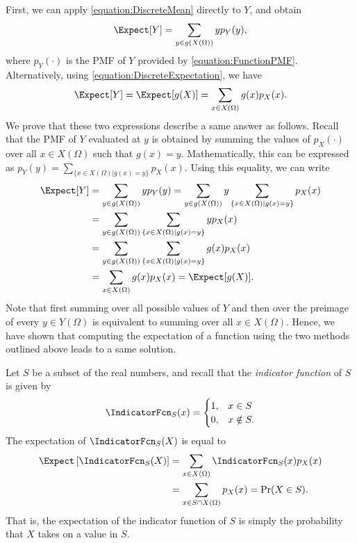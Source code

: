 First, we can apply \eqref{equation:DiscreteMean} directly to $Y$, and obtain
\begin{equation*}
\Expect [Y] = \sum_{y \in g(X(\Omega))} y p_Y(y),
\end{equation*}
where $p_Y (\cdot)$ is the PMF of $Y$ provided by \eqref{equation:FunctionPMF}.
Alternatively, using \eqref{equation:DiscreteExpectation}, we have
\begin{equation*}
\Expect [Y] = \Expect [g(X)] = \sum_{x \in X(\Omega)} g(x) p_X(x) .
\end{equation*}
We prove that these two expressions describe a same answer as follows.
Recall that the PMF of $Y$ evaluated at $y$ is obtained by summing the values of $p_X(\cdot)$ over all $x \in X(\Omega)$ such that $g(x) = y$.
Mathematically, this can be expressed as $p_Y (y) = \sum_{ \{x \in X(\Omega) | g(x) = y \} } p_X (x)$.
Using this equality, we can write
\begin{equation*}
\begin{split}
\Expect [Y] &= \sum_{y \in g(X(\Omega))} y p_Y(y)
= \sum_{y \in g(X(\Omega))} y
\sum_{\{x \in X(\Omega) | g(x) = y\}} p_X(x) \\
&= \sum_{y \in g(X(\Omega))}
\sum_{\{x \in X(\Omega) | g(x) = y\}} y p_X(x) \\
&= \sum_{y \in g(X(\Omega))}
\sum_{\{x \in X(\Omega) | g(x) = y\}} g(x) p_X(x) \\
&= \sum_{x \in X(\Omega)} g(x) p_X(x)
= \Expect [g(X)] .
\end{split}
\end{equation*}
Note that first summing over all possible values of $Y$ and then over the preimage of every $y \in Y(\Omega)$ is equivalent to summing over all $x \in X(\Omega)$.
Hence, we have shown that computing the expectation of a function using the two methods outlined above leads to a same solution.

\begin{example}
Let $S$ be a subset of the real numbers, and recall that the \emph{indicator function} of $S$ is given by 
\begin{equation*}
\IndicatorFcn_S (x) = \begin{cases} 1, & x \in S\\
0, & x \notin S . \end{cases}
\end{equation*}
The expectation of $\IndicatorFcn_S (X)$ is equal to
\begin{equation*}
\begin{split}
\Expect \left[ \IndicatorFcn_S (X) \right]
&= \sum_{x \in X(\Omega)} \IndicatorFcn_S (x) p_X(x) \\
&= \sum_{x \in S \cap X(\Omega)} p_X(x)
= \Pr (X \in S) .
\end{split}
\end{equation*}
That is, the expectation of the indicator function of $S$ is simply the probability that $X$ takes on a value in $S$.
\end{example}

